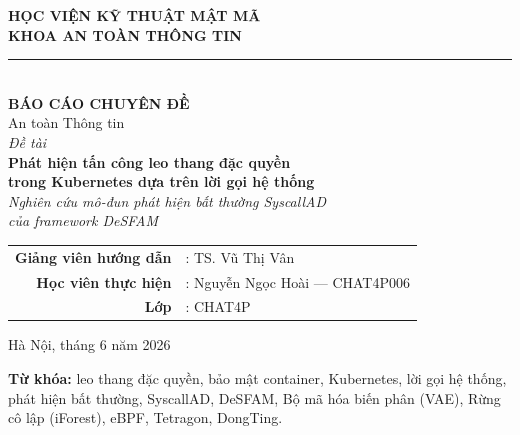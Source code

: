 \documentclass[12pt,a4paper]{article}
\begin{document}
\begin{titlepage}
\centering
{\large\bfseries HỌC VIỆN KỸ THUẬT MẬT MÃ}\\[2pt]
{\large\bfseries KHOA AN TOÀN THÔNG TIN}\\[6pt]
\rule{\textwidth}{0.8pt}\\[2.2cm]

{\Large\bfseries BÁO CÁO CHUYÊN ĐỀ}\\[6pt]
{\large An toàn Thông tin}\\[2.4cm]

{\large\itshape Đề tài}\\[10pt]
{\LARGE\bfseries Phát hiện tấn công leo thang đặc quyền\\[4pt]
trong Kubernetes dựa trên lời gọi hệ thống\\[10pt]}
{\large\itshape Nghiên cứu mô-đun phát hiện bất thường SyscallAD\\[2pt]
của framework DeSFAM}\\[2.4cm]

\begin{tabular}{rl}
  \textbf{Giảng viên hướng dẫn} & : TS. Vũ Thị Vân\\[5pt]
  \textbf{Học viên thực hiện}   & : Nguyễn Ngọc Hoài --- CHAT4P006\\[5pt]
  \textbf{Lớp}                  & : CHAT4P\\
\end{tabular}

\vfill
{\large Hà Nội, tháng 6 năm 2026}
\end{titlepage}


\begin{abstract}

\end{abstract}

\noindent\textbf{Từ khóa:} leo thang đặc quyền, bảo mật container, Kubernetes, lời
gọi hệ thống, phát hiện bất thường, SyscallAD, DeSFAM, Bộ mã hóa biến phân (VAE),
Rừng cô lập (iForest), eBPF, Tetragon, DongTing.

\clearpage
\tableofcontents
\clearpage
\listoffigures
\listoftables
\clearpage















\appendix

\end{document}
